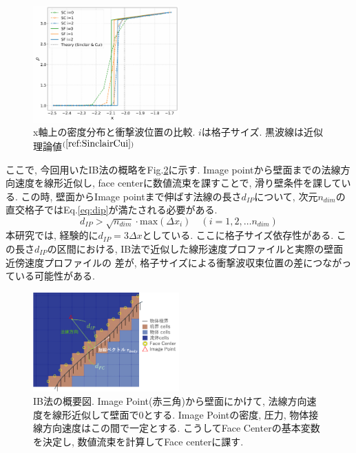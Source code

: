 \documentclass[a4j]{jarticle}
\begin{document}
\begin{figure}[h]
    \begin{center}
        \includegraphics[width=0.5\textwidth]{2Dcircle_shockposi_comp.pdf}
    \end{center}
    \caption{x軸上の密度分布と衝撃波位置の比較. $i$は格子サイズ. 黒波線は近似理論値$^{(\ref{ref:SinclairCui})}$}
    \label{fig:2Dcircle_shockposi}
\end{figure}

ここで, 今回用いたIB法の概略をFig.\ref{fig:IBsitu}に示す. Image pointから壁面までの法線方向速度を線形近似し,
face centerに数値流束を課すことで, 滑り壁条件を課している.
この時, 壁面からImage pointまで伸ばす法線の長さ$d_{IP}$について, 
次元$n_{dim}$の直交格子ではEq.\ref{eq:dip}が満たされる必要がある.
\begin{equation}
    d_{IP} > \sqrt{n_{dim}} \cdot \text{max} (\Delta x_{i}) \quad (i = 1, 2, \dots n_{dim})
    \label{eq:dip}
\end{equation}
本研究では, 経験的に$d_{IP} = 3 \Delta x$としている.
ここに格子サイズ依存性がある. 
この長さ$d_{IP}$の区間における, 
IB法で近似した線形速度プロファイルと実際の壁面近傍速度プロファイルの
差が, 格子サイズによる衝撃波収束位置の差につながっている可能性がある.

\begin{figure}[h]
    \begin{center}
        \includegraphics[width=0.5\textwidth]{IBsitu.pdf}
    \end{center}
    \caption{IB法の概要図. Image Point(赤三角)から壁面にかけて, 法線方向速度を線形近似して壁面で0とする.
    Image Pointの密度, 圧力, 物体接線方向速度はこの間で一定とする. こうしてFace Centerの基本変数を決定し, 
    数値流束を計算してFace centerに課す.}
    \label{fig:IBsitu}
\end{figure}
\end{document}
